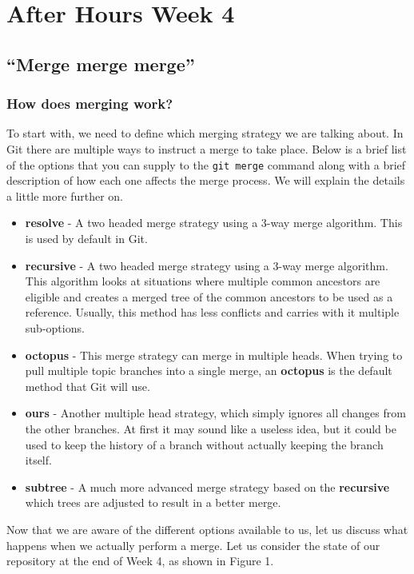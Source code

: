 \chapter{After Hours Week 4}
\section{``Merge merge merge''}
\subsection{How does merging work?}

To start with, we need to define which merging strategy we are talking about.  In Git there are multiple ways to instruct a merge to take place.  Below is a brief list of the options that you can supply to the \texttt{git merge} command along with a brief description of how each one affects the merge process.  We will explain the details a little more further on.

\begin{itemize}
\item\textbf{resolve} - A two headed merge strategy using a 3-way merge algorithm.  This is used by default in Git.
\item\textbf{recursive} - A two headed merge strategy using a 3-way merge algorithm.  This algorithm looks at situations where multiple common ancestors are eligible and creates a merged tree of the common ancestors to be used as a reference.  Usually, this method has less conflicts and carries with it multiple sub-options.
\item\textbf{octopus} - This merge strategy can merge in multiple heads.  When trying to pull multiple topic branches into a single merge, an \textbf{octopus} is the default method that Git will use.
\item\textbf{ours} - Another multiple head strategy, which simply ignores all changes from the other branches.  At first it may sound like a useless idea, but it could be used to keep the history of a branch without actually keeping the branch itself.
\item\textbf{subtree} - A much more advanced merge strategy based on the \textbf{recursive} which trees are adjusted to result in a better merge.
\end{itemize}

Now that we are aware of the different options available to us, let us discuss what happens when we actually perform a merge.  Let us consider the state of our repository at the end of Week 4, as shown in Figure 1.

